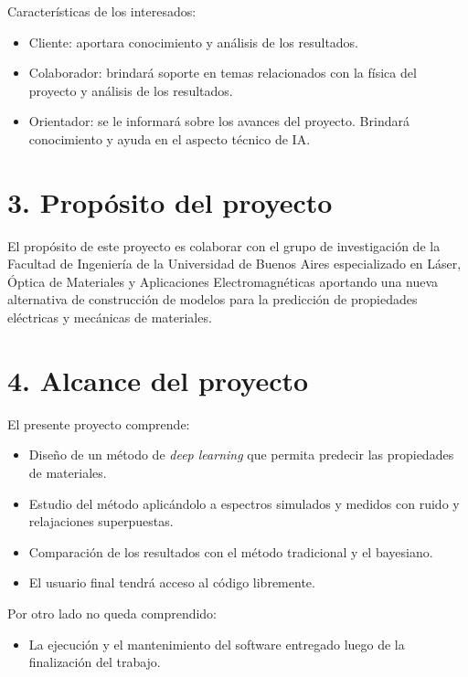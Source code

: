 \documentclass[
11pt, %
codirector, %
]{charter}
\begin{document}
Características de los interesados:

\begin{itemize}
	\item Cliente: aportara conocimiento y análisis de los resultados.
	\item Colaborador: brindará soporte en temas relacionados con la física del proyecto 
	y análisis de los resultados.
	\item Orientador: se le informará sobre los avances del proyecto. Brindará conocimiento
	y ayuda en el aspecto técnico de IA.    
\end{itemize}



\section{3. Propósito del proyecto}
\label{sec:proposito}

El propósito de este proyecto es colaborar con el grupo de investigación de la Facultad 
de Ingeniería de la Universidad de Buenos Aires especializado en Láser, Óptica de Materiales 
y Aplicaciones Electromagnéticas aportando una nueva alternativa de construcción de modelos 
para la predicción de propiedades eléctricas y mecánicas de materiales.

\section{4. Alcance del proyecto}
\label{sec:alcance}

El presente proyecto comprende:

\begin{itemize}
	\item Diseño de un método de \textit{deep learning} que permita predecir las propiedades de materiales.
	\item Estudio del método aplicándolo a espectros simulados y medidos con ruido y relajaciones superpuestas.
	\item Comparación de los resultados con el método tradicional y el bayesiano.
	\item El usuario final tendrá acceso al código libremente.
\end{itemize}


Por otro lado no queda comprendido:

\begin{itemize}
	\item La ejecución y el mantenimiento del software entregado luego de la finalización del trabajo.
\end{itemize}
\end{document}
